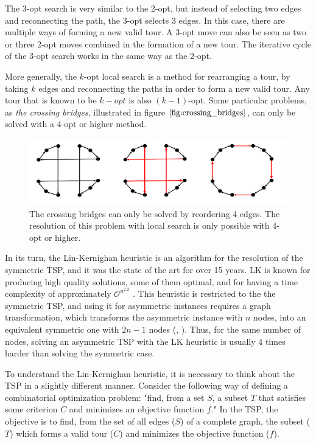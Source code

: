 The 3-opt search is very similar to the 2-opt, but instead of selecting two edges and reconnecting the path, the 3-opt selects 3 edges. In this case, there are multiple ways of forming a new valid tour. A 3-opt move can also be seen as two or three 2-opt moves combined in the formation of a new tour. The iterative cycle of the 3-opt search works in the same way as the 2-opt.

More generally, the $k$-opt local search is a method for rearranging a tour, by taking $k$ edges and reconnecting the paths in order to form a new valid tour. Any tour that is known to be $k-opt$ is also $(k-1)$-opt. Some particular problems, as \textit{the crossing bridges}, illustrated in figure $\ref{fig:crossing_bridges}$, can only be solved with a 4-opt or higher method.

\begin{figure}[htbp]
  \centering
  \includegraphics[width=.7\textwidth]{./Figures/tsp/crossing_bridges}
  \caption{The crossing bridges can only be solved by reordering 4 edges.
  The resolution of this problem with local search is only possible
  with 4-opt or higher.}
  \label{fig:crossing_bridges}
\end{figure}


In its turn, the Lin-Kernighan heuristic \cite{lkh_original} is an algorithm for the resolution of  the symmetric TSP, and it was the state of the art for over 15 years. LK is known for producing high quality solutions, some of them optimal, and for having a time complexity of approximately $\mathcal{O}^{n^{2.2}}$ \cite{heuristics_tsp}. This heuristic is restricted to the  the symmetric TSP, and using it for asymmetric instances requires a graph transformation, which transforms the asymmetric instance with $n$ nodes, into an equivalent symmetric one with $2n-1$ nodes (\cite{atsp_to_tsp_1}, \cite{atsp_to_tsp_2}). Thus, for the same number of nodes, solving an asymmetric TSP with the LK heuristic is usually 4 times harder than solving the symmetric case.

To understand the Lin-Kernighan heuristic, it is necessary to think about the TSP in a slightly different manner. Consider the following way of defining a combinatorial optimization problem: "find, from a set $S$, a subset $T$ that satisfies some criterion $C$ and minimizes an objective function $f$." In the TSP, the objective is to find, from the set of all edges ($S$) of a complete graph, the subset ($T$) which forms a valid tour ($C$) and minimizes the objective function ($f$). 

